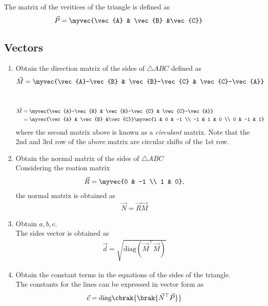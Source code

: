 The matrix of the veritices of the triangle is defined as
		\begin{align}
			\vec{P} = \myvec{\vec{A} & \vec{B} &\vec{C}}
		\end{align}
		\subsection{Vectors}
\begin{enumerate}[label=\thesubsection.\arabic*.,ref=\thesubsection.\theenumi]
\item Obtain the direction matrix of the sides of $\triangle ABC$
	defined as 
		\begin{align}
		\vec{M} = 	\myvec{\vec{A}-\vec{B} & \vec{B}-\vec{C} & \vec{C}-\vec{A}}
		\end{align}
	\\
		\solution 

		\begin{align}
			\vec{M} &= \myvec{\vec{A}-\vec{B} & \vec{B}-\vec{C} & \vec{C}-\vec{A}}
			\\
			&= 
			\myvec{\vec{A} & \vec{B} &\vec{C}}
			\myvec{1 & 0 & -1 \\ -1 & 1 & 0 \\ 0 & -1 & 1}
		\end{align}
		where the second matrix above 
		is known as a {\em circulant} matrix.  Note that the 2nd and 3rd row of the above matrix are circular shifts of the 1st row.
	\item Obtain the normal matrix  of the sides of $\triangle ABC$
		\\
		\solution Considering the roation matrix
		\begin{align}
			\vec{R}  = \myvec{0 & -1 \\ 1 & 0},
		\end{align}
		the normal matrix is obtained as
		\begin{align}
			\vec{N} = \vec{R}\vec{M} 
		\end{align}

	\item Obtain $a, b, c$.
		\\
		\solution The sides vector is obtained as
		\begin{align}
			\vec{d} = \sqrt{\text{diag}(\vec{M}^{\top}\vec{M})}
		\end{align}
	\item Obtain the constant terms in the equations of the sides of the triangle. 
		\\
		\solution The constants for the lines can be expressed in vector form as
		\begin{align}
			\vec{c} = \text{diag}\cbrak{\brak{\vec{N}^{\top}\vec{P}}} 
		\end{align}
\end{enumerate}
